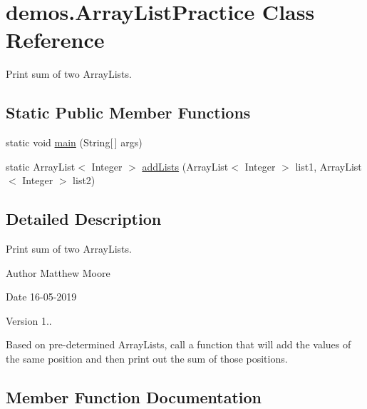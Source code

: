\hypertarget{classdemos_1_1_array_list_practice}{}\section{demos.\+Array\+List\+Practice Class Reference}
\label{classdemos_1_1_array_list_practice}


Print sum of two Array\+Lists.  


\subsection*{Static Public Member Functions}
\begin{DoxyCompactItemize}
\item 
static void \mbox{\hyperlink{classdemos_1_1_array_list_practice_a8b4f19ba3c6af345fa135554f632426f}{main}} (String\mbox{[}$\,$\mbox{]} args)
\item 
static Array\+List$<$ Integer $>$ \mbox{\hyperlink{classdemos_1_1_array_list_practice_a0255bcad65a9079e2bd3b115a28b0fd5}{add\+Lists}} (Array\+List$<$ Integer $>$ list1, Array\+List$<$ Integer $>$ list2)
\end{DoxyCompactItemize}


\subsection{Detailed Description}
Print sum of two Array\+Lists. 

\begin{DoxyAuthor}{Author}
Matthew Moore 
\end{DoxyAuthor}
\begin{DoxyDate}{Date}
16-\/05-\/2019 
\end{DoxyDate}
\begin{DoxyVersion}{Version}
1..
\end{DoxyVersion}
Based on pre-\/determined Array\+Lists, call a function that will add the values of the same position and then print out the sum of those positions. 

\subsection{Member Function Documentation}
\mbox{\label{classdemos_1_1_array_list_practice_a0255bcad65a9079e2bd3b115a28b0fd5}} 
